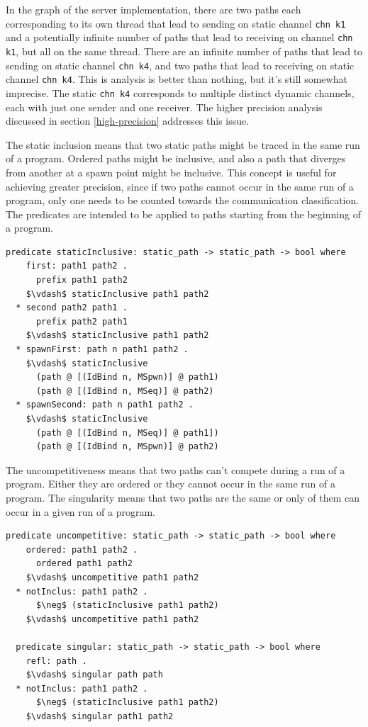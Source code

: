\documentclass[letterpaper, 11pt]{report}
\begin{document}
In the graph of the server implementation, there are two paths each corresponding to its
own thread that lead
to sending on
static channel \lstinline[language=sugar_lang]{chn k1} and a potentially infinite number of
paths that lead to receiving on
channel \lstinline[language=sugar_lang]{chn k1}, but all on the same thread.
There are an infinite number of paths that lead
to sending on static channel \lstinline[language=sugar_lang]{chn k4}, and two paths
that lead to receiving on static channel
\lstinline[language=sugar_lang]{chn k4}. This is analysis is better than nothing,
but it's still somewhat imprecise. The static \lstinline[language=sugar_lang]{chn k4} corresponds to
multiple distinct dynamic channels, each with just one sender and one receiver. The higher
precision analysis discussed in section \ref{high-precision} addresses this issue.

The static inclusion means that two static paths might be traced in
the same run of a program. Ordered paths might be inclusive, and also a path that diverges
from another at a spawn point might be inclusive. This concept is useful for achieving
greater precision, since if two paths cannot occur in the same run of a program, only one needs
to be counted towards the communication classification. The predicates are intended to be applied
to paths starting from the beginning of a program.

\begin{lstlisting}[language=logic, mathescape]
  predicate staticInclusive: static_path -> static_path -> bool where
    first: path1 path2 .
      prefix path1 path2
    $\vdash$ staticInclusive path1 path2
  * second path2 path1 .
      prefix path2 path1
    $\vdash$ staticInclusive path1 path2
  * spawnFirst: path n path1 path2 .
    $\vdash$ staticInclusive
      (path @ [(IdBind n, MSpwn)] @ path1)
      (path @ [(IdBind n, MSeq)] @ path2)
  * spawnSecond: path n path1 path2 .
    $\vdash$ staticInclusive
      (path @ [(IdBind n, MSeq)] @ path1])
      (path @ [(IdBind n, MSpwn)] @ path2)
\end{lstlisting}

The uncompetitiveness means that two paths can't compete during a run of a
program. Either they are ordered or they cannot occur in the same run of a program.
The singularity means that two paths are the same or only of them can occur
in a given run of a program. 

\begin{lstlisting}[language=logic, mathescape]
  predicate uncompetitive: static_path -> static_path -> bool where
    ordered: path1 path2 .
      ordered path1 path2
    $\vdash$ uncompetitive path1 path2
  * notInclus: path1 path2 .
      $\neg$ (staticInclusive path1 path2)
    $\vdash$ uncompetitive path1 path2

  predicate singular: static_path -> static_path -> bool where
    refl: path .
    $\vdash$ singular path path
  * notInclus: path1 path2 .
      $\neg$ (staticInclusive path1 path2)
    $\vdash$ singular path1 path2
\end{lstlisting}
\end{document}
